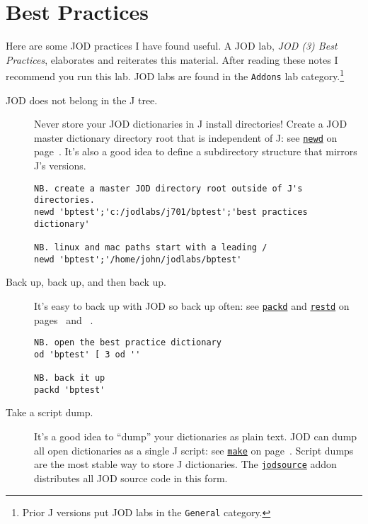 \section{Best Practices}

Here are some JOD practices I have found useful.  A JOD lab, \emph{JOD (3) Best Practices}, elaborates and reiterates this material.  After reading these notes I recommend you run this lab.  JOD labs are 
found in the \texttt{Addons} lab category.\footnote{Prior J versions put JOD labs in the \texttt{General} category.}


\begin{description}
\item[JOD does not belong in the J tree.] Never store your JOD dictionaries in J install directories!  Create a JOD master dictionary directory root that is  independent of J: see \hyperlink{il:newd}{\texttt{newd}} on page~\pageref{ss:newd}.  It's also a good idea to define a subdirectory structure that mirrors J's versions. 

\begin{lstlisting}[frame=single,framerule=0pt]
NB. create a master JOD directory root outside of J's directories.
newd 'bptest';'c:/jodlabs/j701/bptest';'best practices dictionary'

NB. linux and mac paths start with a leading /
newd 'bptest';'/home/john/jodlabs/bptest'
\end{lstlisting}

\item[Back up, back up, and then back up.]  It's easy to back up with JOD so back up often: see 
\hyperlink{il:packd}{\texttt{packd}} and \hyperlink{il:restd}{\texttt{restd}} on pages~\pageref{ss:packd} and ~\pageref{ss:restd}.

\begin{lstlisting}[frame=single,framerule=0pt]
NB. open the best practice dictionary
od 'bptest' [ 3 od ''

NB. back it up
packd 'bptest'
\end{lstlisting}
 

\item[Take a script dump.]  It's a good idea to ``dump'' your dictionaries as plain text.  JOD can dump all open dictionaries as a single J script: see \hyperlink{il:make}{\texttt{make}} on page~\pageref{ss:make}. Script dumps are the most stable way to store J dictionaries.  The 
\href{https://www.jsoftware.com/jwiki/Addons/general/jodsource}{\texttt{jodsource}} addon 
distributes all JOD source code in this form.


\end{description}
